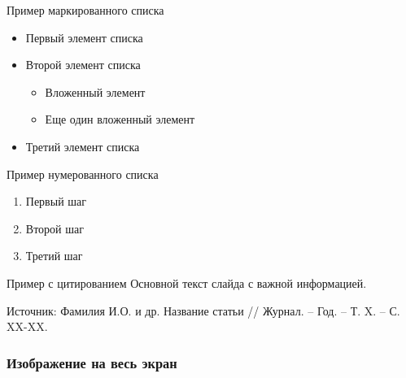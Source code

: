 \documentclass[10pt]{beamer}  %
\begin{document}
\begin{frame}{Пример маркированного списка}
    \begin{itemize}
        \item Первый элемент списка
        \item Второй элемент списка
            \begin{itemize}
                \item Вложенный элемент
                \item Еще один вложенный элемент
            \end{itemize}
        \item Третий элемент списка
    \end{itemize}
\end{frame}

\begin{frame}{Пример нумерованного списка}
    \begin{enumerate}
        \item Первый шаг
        \item Второй шаг
        \item Третий шаг
    \end{enumerate}
\end{frame}

\begin{frame}{Пример с цитированием}
    Основной текст слайда с важной информацией.
    
    \vspace{1em}
    
    \tiny Источник: Фамилия И.О. и др. Название статьи // Журнал. – Год. – Т. X. – С. XX-XX.
\end{frame}

\begin{frame}[plain]
    \frametitle{Изображение на весь экран}
\end{frame}
\end{document}
